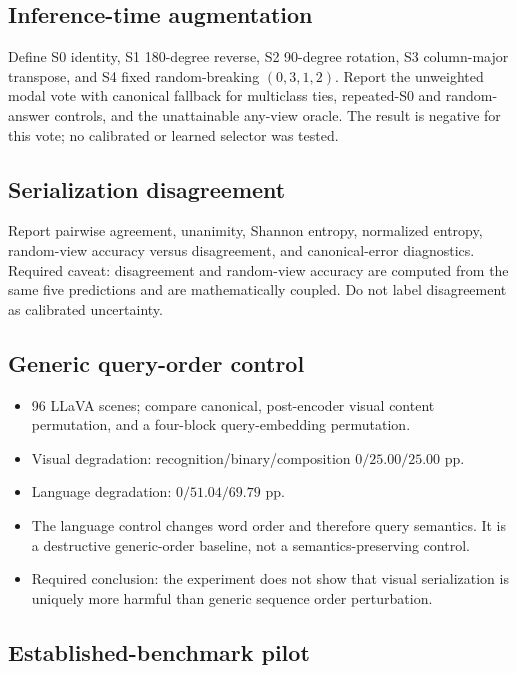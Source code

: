 \documentclass[10pt,twocolumn,letterpaper]{article}
\begin{document}
\subsection{Inference-time augmentation}

Define S0 identity, S1 180-degree reverse, S2 90-degree rotation, S3 column-major transpose, and S4 fixed random-breaking $(0,3,1,2)$.
Report the unweighted modal vote with canonical fallback for multiclass ties, repeated-S0 and random-answer controls, and the unattainable any-view oracle.
The result is negative for this vote; no calibrated or learned selector was tested.

\subsection{Serialization disagreement}

Report pairwise agreement, unanimity, Shannon entropy, normalized entropy, random-view accuracy versus disagreement, and canonical-error diagnostics.
Required caveat: disagreement and random-view accuracy are computed from the same five predictions and are mathematically coupled.
Do not label disagreement as calibrated uncertainty.

\subsection{Generic query-order control}

\begin{itemize}[leftmargin=*]
    \item 96 LLaVA scenes; compare canonical, post-encoder visual content permutation, and a four-block query-embedding permutation.
    \item Visual degradation: recognition/binary/composition $0/25.00/25.00$ pp.
    \item Language degradation: $0/51.04/69.79$ pp.
    \item The language control changes word order and therefore query semantics.  It is a destructive generic-order baseline, not a semantics-preserving control.
    \item Required conclusion: the experiment does not show that visual serialization is uniquely more harmful than generic sequence order perturbation.
\end{itemize}

\subsection{Established-benchmark pilot}
\end{document}
